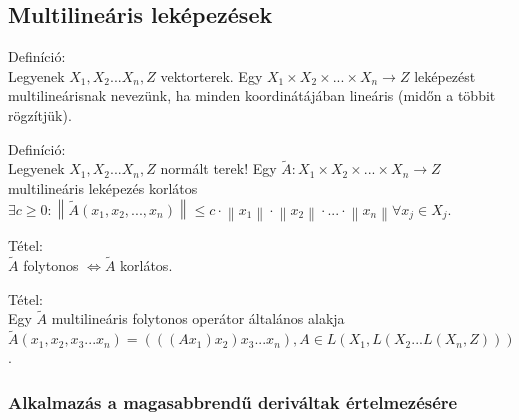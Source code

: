 \documentclass[12pt,a4paper]{scrartcl}
\newenvironment{definicio}{}{}
\newenvironment{tetel}{}{}
\begin{document}
\hypertarget{multilinearis-lekepezesek}{%
\subsection{Multilineáris leképezések}\label{multilinearis-lekepezesek}}

\begin{definicio}

Definíció:\\
Legyenek \(X_{1},X_{2}...X_{n},Z\) vektorterek. Egy
\(\left. X_{1} \times X_{2} \times ... \times X_{n}\rightarrow Z \right.\)
leképezést multilineárisnak nevezünk, ha minden koordinátájában lineáris
(midőn a többit rögzítjük).

\end{definicio}

\begin{definicio}

Definíció:\\
Legyenek \(X_{1},X_{2}...X_{n},Z\) normált terek! Egy
\(\left. \widetilde{A}:X_{1} \times X_{2} \times ... \times X_{n}\rightarrow Z \right.\)
multilineáris leképezés korlátos
\(\exists c \geq 0:\left\| {\widetilde{A}\left( {x_{1},x_{2},...,x_{n}} \right)} \right\| \leq c \cdot \left\| x_{1} \right\| \cdot \left\| x_{2} \right\| \cdot ... \cdot \left\| x_{n} \right\|\forall x_{j} \in X_{j}\).

\end{definicio}

\begin{tetel}

Tétel:\\
\(\widetilde{A}\) folytonos
\(\left. \Leftrightarrow\widetilde{A} \right.\) korlátos.

\end{tetel}

\begin{tetel}

Tétel:\\
Egy \(\widetilde{A}\) multilineáris folytonos operátor általános alakja
\(\widetilde{A}\left( {x_{1},x_{2},x_{3}...x_{n}} \right) = \left( {\left( {\left( {Ax_{1}} \right)x_{2}} \right)x_{3}...x_{n}} \right),A \in L\left( {X_{1},L\left( {X_{2}...L\left( {X_{n},Z} \right)} \right)} \right)\).

\end{tetel}

\hypertarget{alkalmazas-a-magasabbrendu-derivaltak-ertelmezesere}{%
\subsubsection{Alkalmazás a magasabbrendű deriváltak
értelmezésére}\label{alkalmazas-a-magasabbrendu-derivaltak-ertelmezesere}}
\end{document}
